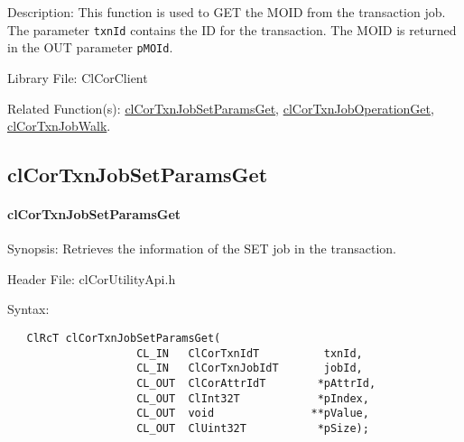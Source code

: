 \begin{flushleft}
\begin{Desc}
\begin{description}
\end{description}
\end{Desc}
\begin{Desc}
\item[Description:] This function is used to GET the MOID from the transaction job. The parameter {\tt{txnId}} contains the ID for the transaction. The 
MOID is returned in the OUT parameter {\tt{pMOId}}.
\end{Desc}
\begin{Desc}
\item[Library File:]Cl\-Cor\-Client\end{Desc}
\begin{Desc}
\item[Related Function(s):]\hyperlink{pagecor203}{clCorTxnJobSetParamsGet}, \hyperlink{pagecor204}{clCorTxnJobOperationGet}, 
\hyperlink{pagecor205}{clCorTxnJobWalk}.
\end{Desc} 	
\newpage


	

\subsection{clCorTxnJobSetParamsGet}
\hypertarget{pagecor203}{}\paragraph{cl\-Cor\-Txn\-Job\-Set\-Params\-Get}\label{pagecor203}
\begin{Desc}
\item[Synopsis:] Retrieves the information of the SET job in the transaction.
\end{Desc}
\begin{Desc}
\item[Header File:]clCorUtilityApi.h\end{Desc}
\begin{Desc}
\item[Syntax:]

\footnotesize\begin{verbatim}   ClRcT clCorTxnJobSetParamsGet(
					CL_IN   ClCorTxnIdT          txnId,
					CL_IN   ClCorTxnJobIdT       jobId,
					CL_OUT  ClCorAttrIdT        *pAttrId,
					CL_OUT  ClInt32T            *pIndex,
					CL_OUT  void               **pValue,
					CL_OUT  ClUint32T           *pSize);


\end{verbatim}
\end{Desc}
\end{flushleft}
